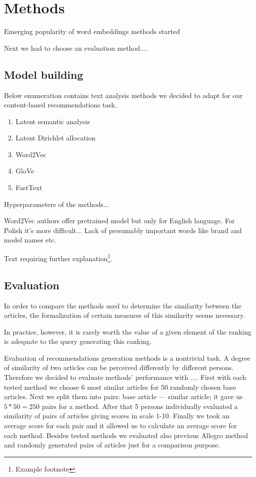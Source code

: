 \documentclass[twoside,twocolumn]{article}
\begin{document}
	\section{Methods}

	Emerging popularity of word embeddings methods started 
	
	Next we had to choose an evaluation method....

	\subsection{Model building}
	
	Below enumeration contains text analysis methods we decided to adapt for our content-based recommendations task.
	
	\begin{enumerate}
		\item Latent semantic analysis
		\item Latent Dirichlet allocation
		\item Word2Vec %
		\item GloVe
		\item FastText
	\end{enumerate}
	
	Hyperparameters of the methods...
	
	Word2Vec authors offer pretrained model but only for English language. For Polish it's more difficult...
	Lack of presumably important words like brand and model names etc.  
	
	
	
	
	Text requiring further explanation\footnote{Example footnote}.
	
	\subsection{Evaluation}
	
	In order to compare the methods used to determine the similarity between the articles, the formalization of certain measures of this similarity seems necessary.
	
	
	In practice, however, it is rarely worth the value of a given element of the ranking
	is adequate to the query generating this ranking.
	
	Evaluation of recommendations generation methods is a nontrivial task. A degree of similarity of two articles can be perceived differently by different persons. Therefore we decided to evaluate methods' performance with .... First with each tested method we choose 6 most similar articles for 50 randomly chosen base articles. Next we split them into pairs: base article --- similar article; it gave us $5*50=250$ pairs for a method. After that 5 persons individually evaluated a similarity of pairs of articles giving scores in scale 1-10. Finally we took an average score for each pair and it allowed us to calculate an average score for each method. Besides tested methods we evaluated also previous Allegro method and randomly generated pairs of articles just for a comparison purpose.
	
\end{document}
